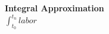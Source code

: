 \documentclass{article}
\begin{document}
\begin{center}
\textbf{ Integral Approximation }\\
$\int_{t_0}^{t_n}labor $ 
\end{center}
\end{document}
